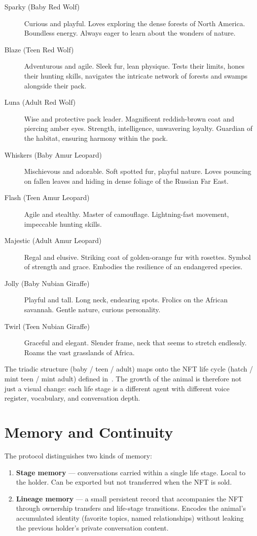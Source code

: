 \documentclass[11pt,letterpaper]{article}
\begin{document}
\begin{description}
\item[Sparky (Baby Red Wolf)] Curious and playful. Loves exploring the dense forests of North America. Boundless energy. Always eager to learn about the wonders of nature.
\item[Blaze (Teen Red Wolf)] Adventurous and agile. Sleek fur, lean physique. Tests their limits, hones their hunting skills, navigates the intricate network of forests and swamps alongside their pack.
\item[Luna (Adult Red Wolf)] Wise and protective pack leader. Magnificent reddish-brown coat and piercing amber eyes. Strength, intelligence, unwavering loyalty. Guardian of the habitat, ensuring harmony within the pack.
\item[Whiskers (Baby Amur Leopard)] Mischievous and adorable. Soft spotted fur, playful nature. Loves pouncing on fallen leaves and hiding in dense foliage of the Russian Far East.
\item[Flash (Teen Amur Leopard)] Agile and stealthy. Master of camouflage. Lightning-fast movement, impeccable hunting skills.
\item[Majestic (Adult Amur Leopard)] Regal and elusive. Striking coat of golden-orange fur with rosettes. Symbol of strength and grace. Embodies the resilience of an endangered species.
\item[Jolly (Baby Nubian Giraffe)] Playful and tall. Long neck, endearing spots. Frolics on the African savannah. Gentle nature, curious personality.
\item[Twirl (Teen Nubian Giraffe)] Graceful and elegant. Slender frame, neck that seems to stretch endlessly. Roams the vast grasslands of Africa.
\end{description}

The triadic structure (baby / teen / adult) maps onto the NFT life cycle (hatch / mint teen / mint adult) defined in~\cite{zoo2021}. The growth of the animal is therefore not just a visual change: each life stage is a different agent with different voice register, vocabulary, and conversation depth.

\section{Memory and Continuity}

The protocol distinguishes two kinds of memory:

\begin{enumerate}
  \item \textbf{Stage memory} --- conversations carried within a single life stage. Local to the holder. Can be exported but not transferred when the NFT is sold.
  \item \textbf{Lineage memory} --- a small persistent record that accompanies the NFT through ownership transfers and life-stage transitions. Encodes the animal's accumulated identity (favorite topics, named relationships) without leaking the previous holder's private conversation content.
\end{enumerate}
\end{document}
